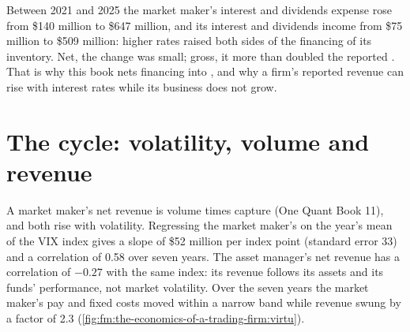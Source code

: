 \begin{remark}\label{rem:fm:the-economics-of-a-trading-firm:financing}
Between 2021 and 2025 the market maker's interest and dividends expense rose from \$140 million to \$647 million, and its interest and dividends
income from \$75 million to \$509 million: higher rates raised both sides of the financing of its inventory. Net, the change was small; gross, it
more than doubled the reported . That is why this book nets financing into , and why a firm's reported
revenue can rise with interest rates while its business does not grow.
\end{remark}

\section{The cycle: volatility, volume and revenue}

A market maker's net revenue is volume times capture (One Quant Book 11), and both rise with volatility. Regressing the market maker's  on the year's mean of the VIX index gives a slope of \$52 million per index point (standard error 33) and a correlation of 0.58 over seven
years. The asset manager's net revenue has a correlation of $-0.27$ with the same index: its revenue follows its assets and its funds'
performance, not market volatility. Over the seven years the market maker's pay and fixed costs moved within a narrow band while revenue swung
by a factor of 2.3 (\cref{fig:fm:the-economics-of-a-trading-firm:virtu}).

